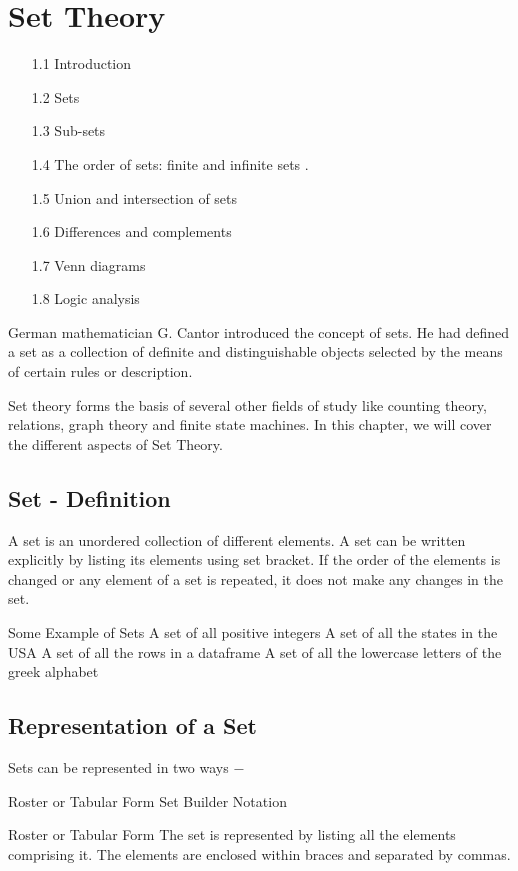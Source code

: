 \documentclass[12pt]{article}
\begin{document}
\section*{Set Theory}
\Large
\begin{itemize}
\item[1.1] Introduction  
\item[1.2] Sets  
\item[1.3] Sub-sets  
\item[1.4] The order of sets: finite and infinite sets .
\item[1.5] Union and intersection of sets  
\item[1.6] Differences and complements  
\item[1.7] Venn diagrams  
\item[1.8] Logic analysis
\end{itemize}  
\newpage
German mathematician G. Cantor introduced the concept of sets. He had defined a set as a collection of definite and distinguishable objects selected by the means of certain rules or description.

Set theory forms the basis of several other fields of study like counting theory, relations, graph theory and finite state machines. In this chapter, we will cover the different aspects of Set Theory.

\subsection{Set - Definition}
A set is an unordered collection of different elements. A set can be written explicitly by listing its elements using set bracket. If the order of the elements is changed or any element of a set is repeated, it does not make any changes in the set.

Some Example of Sets
A set of all positive integers
A set of all the states in the USA
A set of all the rows in a dataframe
A set of all the lowercase letters of the greek alphabet

\subsection{Representation of a Set}
Sets can be represented in two ways −

Roster or Tabular Form
Set Builder Notation

Roster or Tabular Form
The set is represented by listing all the elements comprising it. The elements are enclosed within braces and separated by commas.
\end{document}
